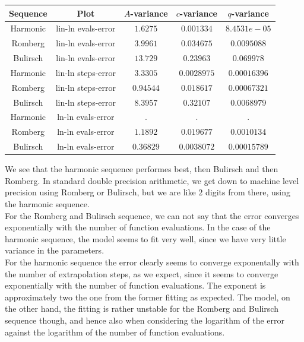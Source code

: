 \begin{table}[H]
    \centering
    \begin{tabular}{c|c||c|c|c}
Sequence & Plot & \(A\)-variance & \(c\)-variance & \(q\)-variance\\\hline
Harmonic & lin-ln evals-error & \(1.6275\) & \(0.001334\) & \(8.4531e-05\) \\
Romberg & lin-ln evals-error & \(3.9961\) & \(0.034675\) & \(0.0095088\) \\
Bulirsch & lin-ln evals-error & \(13.729\) & \(0.23963\) & \(0.069978\) \\
Harmonic & lin-ln steps-error & \(3.3305\) & \(0.0028975\) & \(0.00016396\) \\
Romberg & lin-ln steps-error & \(0.94544\) & \(0.018617\) & \(0.00067321\) \\
Bulirsch & lin-ln steps-error & \(8.3957\) & \(0.32107\) & \(0.0068979\) \\
Harmonic & ln-ln evals-error & . & . & . \\
Romberg & ln-ln evals-error & \(1.1892\) & \(0.019677\) & \(0.0010134\) \\
Bulirsch & ln-ln evals-error & \(0.36829\) & \(0.0038072\) & \(0.00015789\) \\
    \end{tabular}
    \label{tab:my_label}
\end{table}

We see that the harmonic sequence performes best, then Bulirsch and then Romberg. In standard double precision arithmetic, we get down to machine level precision using Romberg or Bulirsch, but we are like \(2\) digits from there, using the harmonic sequence.\\

For the Romberg and Bulirsch sequence, we can not say that the error converges exponentially with the number of function evaluations. In the case of the harmonic sequence, the model seems to fit very well, since we have very little variance in the parameters.\\

For the harmonic sequence the error clearly seems to converge exponentally with the number of extrapolation steps, as we expect, since it seems to converge exponentially with the number of function evaluations. The exponent is approximately two the one from the former fitting as expected. The model, on the other hand, the fitting is rather unstable for the Romberg and Bulirsch sequence though, and hence also when considering the logarithm of the error against the logarithm of the number of function evaluations.

